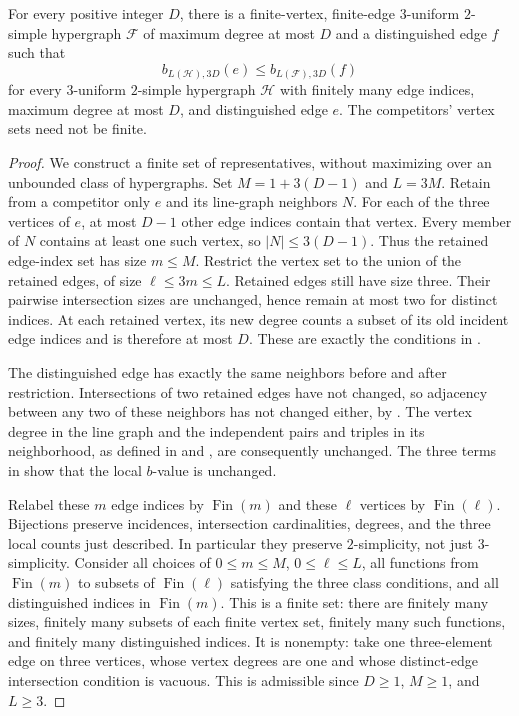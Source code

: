 \begin{lemma}
For every positive integer $D$, there is a finite-vertex, finite-edge
$3$-uniform $2$-simple hypergraph $\mathcal F$ of maximum degree at most $D$
and a distinguished edge $f$ such that
\[
b_{L(\mathcal H),3D}(e)\le b_{L(\mathcal F),3D}(f)
\]
for every $3$-uniform $2$-simple hypergraph $\mathcal H$ with finitely many
edge indices, maximum degree at most $D$, and distinguished edge $e$.
The competitors' vertex sets need not be finite.
\end{lemma}
\begin{proof}
We construct a finite set of representatives, without maximizing over an
unbounded class of hypergraphs. Set $M=1+3(D-1)$ and $L=3M$.
Retain from a competitor only $e$ and its line-graph neighbors $N$.
For each of the three vertices of $e$, at most $D-1$ other edge indices
contain that vertex. Every member of $N$ contains at least one such vertex,
so $|N|\le3(D-1)$. Thus the retained edge-index set has size $m\le M$.
Restrict the vertex set to the union of the retained edges, of size
$\ell\le3m\le L$. Retained edges still have size three. Their pairwise
intersection sizes are unchanged, hence remain at most two for distinct
indices. At each retained vertex, its new degree counts a subset of its
old incident edge indices and is therefore at most $D$. These are exactly
the conditions in .

The distinguished edge has exactly the same neighbors before and after
restriction. Intersections of two retained edges have not changed, so
adjacency between any two of these neighbors has not changed either, by
. The vertex degree in the line graph and
the independent pairs and triples in its neighborhood, as defined in
 and , are
consequently unchanged. The three terms in  show that the local
$b$-value is unchanged.

Relabel these $m$ edge indices by $\operatorname{Fin}(m)$ and these $\ell$
vertices by $\operatorname{Fin}(\ell)$. Bijections preserve incidences,
intersection cardinalities, degrees, and the three local counts just
described. In particular they preserve $2$-simplicity, not just
$3$-simplicity. Consider all choices of $0\le m\le M$, $0\le\ell\le L$,
all functions from $\operatorname{Fin}(m)$ to subsets of
$\operatorname{Fin}(\ell)$ satisfying the three class conditions, and all
distinguished indices in $\operatorname{Fin}(m)$. This is a finite set:
there are finitely many sizes, finitely many subsets of each finite vertex
set, finitely many such functions, and finitely many distinguished indices.
It is nonempty: take one three-element edge on three vertices, whose
vertex degrees are one and whose distinct-edge intersection condition is
vacuous. This is admissible since $D\ge1$, $M\ge1$, and $L\ge3$.


\end{proof}
